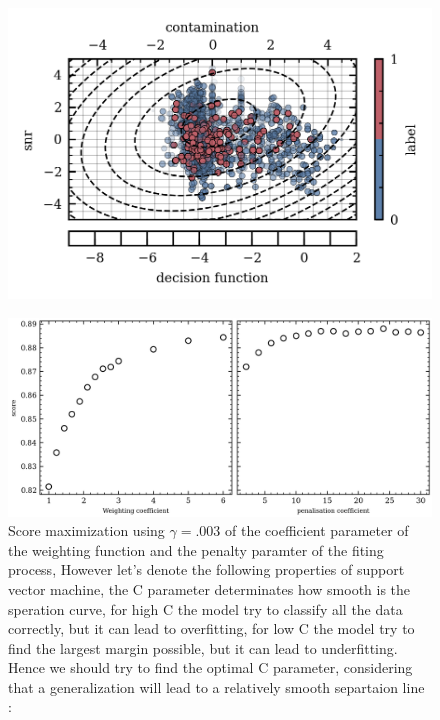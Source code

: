 \documentclass[11pt,a4paper]{report}
\begin{document}
\begin{multicols}{2}

    \begin{figure}[H]
        \centering
        \includegraphics[width=0.9\linewidth]{figure/decision_function_working_5.png}
    \end{figure}

    \begin{figure}[H]
        \centering
        \includegraphics[width=\linewidth]{figure/score.png}
        \caption{Score maximization using $\gamma = .003$ of the coefficient parameter of the weighting function and the penalty paramter of the fiting process, However let's denote the following properties of support vector machine, the C parameter determinates how smooth is the speration curve, for high C the model try to classify all the data correctly, but it can lead to overfitting, for low C the model try to find the largest margin possible, but it can lead to underfitting. Hence we should try to find the optimal C parameter, considering that a generalization will lead to a relatively smooth separtaion line :}
        \label{}
    \end{figure}


\end{multicols}
\end{document}
